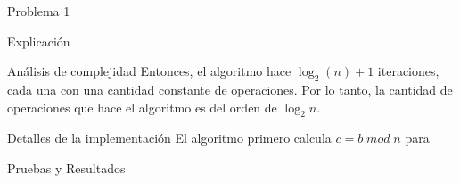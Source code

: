 \begin{section}{Problema 1}
\begin{subsection}{Explicación}
\begin{subsubsection}{Análisis de complejidad}
		Entonces, el algoritmo hace $\log_2(n)+1$ iteraciones, cada una con una cantidad constante de operaciones. 
		Por lo tanto, la cantidad de operaciones que hace el algoritmo es del orden de $\log_2 n$.

		\end{subsubsection}
	\end{subsection}

	\begin{subsection}{Detalles de la implementación}
		El algoritmo primero calcula $c = b\;mod\;n$ para 

	\end{subsection}

	\begin{subsection}{Pruebas y Resultados}

	\end{subsection}

\end{section}

